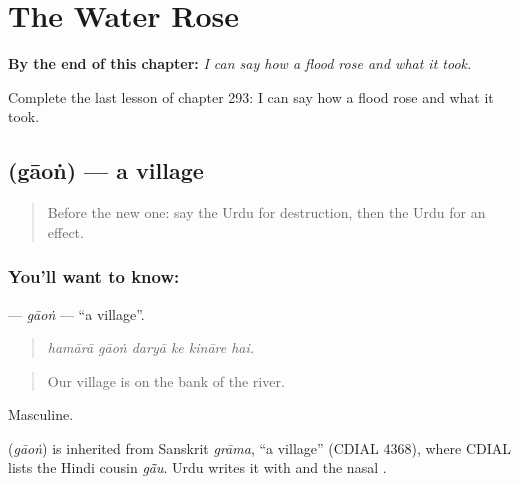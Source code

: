 
\chapter{The Water Rose}
\label{ch:ur-the-water-rose}

\begin{chapteropening}
\textbf{By the end of this chapter:} \emph{I can say how a flood rose and what it took.}

Complete the last lesson of chapter 293: I can say how a flood rose and what it took.
\end{chapteropening}

\section[\texorpdfstring{\ur{گاؤں} (gāoṅ)}{گاؤں (gāoṅ)}]{ (gāoṅ) — a village}

\label{lesson:UR-C293-gaon}



\begin{quote}
Before the new one: say the Urdu for destruction, then the Urdu for an effect.
\end{quote}

\subsection*{You'll want to know: }
\textbf{} — \emph{gāoṅ} — \textquotedblleft{}a village\textquotedblright{}.

\begin{quote}
     
\end{quote}

\begin{quote}
\emph{hamārā gāoṅ daryā ke kināre hai.}
\end{quote}

\begin{quote}
Our village is on the bank of the river.
\end{quote}

Masculine.

\begin{cousinweb}
\textbf{} (\emph{gāoṅ}) is inherited from Sanskrit \emph{grāma}, \textquotedblleft{}a village\textquotedblright{} (CDIAL 4368), where CDIAL lists the Hindi cousin \emph{gā̃u}. Urdu writes it with \textbf{} and the nasal \textbf{}.
\end{cousinweb}

